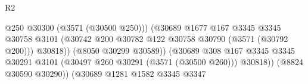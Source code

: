 \begin{lexlean}{R2}
\begin{coremodule}
                                                                @250
                                                                @30300
                                                                (@3571 (@30500 @250)))
                                                              (@30689
                                                                @1677
                                                                @167
                                                                @3345
                                                                @3345
                                                                @30758
                                                                @3101
                                                                (@30742
                                                                  @200
                                                                  @30782
                                                                  @122
                                                                  @30758
                                                                  @30790
                                                                  (@3571 (@30792 @200)))
                                                                @30818))
                                                            (@8050 @30299 @30589))
                                                          (@30689
                                                            @308
                                                            @167
                                                            @3345
                                                            @3345
                                                            @30291
                                                            @3101
                                                            (@30497
                                                              @260
                                                              @30291
                                                              (@3571 (@30500 @260)))
                                                            @30818))
                                                        (@8824 @30590 @30290))
                                                      (@30689
                                                        @1281
                                                        @1582
                                                        @3345
                                                        @3347

\end{coremodule}
\end{lexlean}
